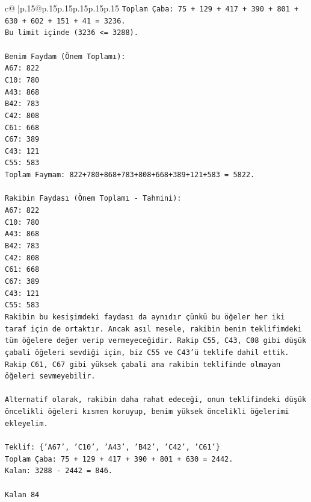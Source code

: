 \documentclass{article}
\begin{document}
{\begin{supertabular}{c@{$\;$}|p{.15\linewidth}@{}p{.15\linewidth}p{.15\linewidth}p{.15\linewidth}p{.15\linewidth}p{.15\linewidth}}
{{{\texttt{Toplam Çaba: 75 + 129 + 417 + 390 + 801 + 630 + 602 + 151 + 41 = 3236.} \\
\texttt{Bu limit içinde (3236 <= 3288).} \\
\\ 
\texttt{Benim Faydam (Önem Toplamı):} \\
\texttt{A67: 822} \\
\texttt{C10: 780} \\
\texttt{A43: 868} \\
\texttt{B42: 783} \\
\texttt{C42: 808} \\
\texttt{C61: 668} \\
\texttt{C67: 389} \\
\texttt{C43: 121} \\
\texttt{C55: 583} \\
\texttt{Toplam Faymam: 822+780+868+783+808+668+389+121+583 = 5822.} \\
\\ 
\texttt{Rakibin Faydası (Önem Toplamı {-} Tahmini):} \\
\texttt{A67: 822} \\
\texttt{C10: 780} \\
\texttt{A43: 868} \\
\texttt{B42: 783} \\
\texttt{C42: 808} \\
\texttt{C61: 668} \\
\texttt{C67: 389} \\
\texttt{C43: 121} \\
\texttt{C55: 583} \\
\texttt{Rakibin bu kesişimdeki faydası da aynıdır çünkü bu öğeler her iki taraf için de ortaktır. Ancak asıl mesele, rakibin benim teklifimdeki tüm öğelere değer verip vermeyeceğidir. Rakip C55, C43, C08 gibi düşük çabali öğeleri sevdiği için, biz C55 ve C43'ü teklife dahil ettik. Rakip C61, C67 gibi yüksek çabali ama rakibin teklifinde olmayan öğeleri sevmeyebilir.} \\
\\ 
\texttt{Alternatif olarak, rakibin daha rahat edeceği, onun teklifindeki düşük öncelikli öğeleri kısmen koruyup, benim yüksek öncelikli öğelerimi ekleyelim.} \\
\\ 
\texttt{Teklif: \{'A67', 'C10', 'A43', 'B42', 'C42', 'C61'\}} \\
\texttt{Toplam Çaba: 75 + 129 + 417 + 390 + 801 + 630 = 2442.} \\
\texttt{Kalan: 3288 {-} 2442 = 846.} \\
\\ 
\texttt{Kalan 84} \\
            }
        }
    }
     \\ \\


\end{supertabular}}
\end{document}
